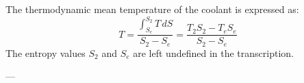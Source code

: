 The thermodynamic mean temperature of the coolant is expressed as:  
\[
T = \frac{\int_{S_e}^{S_2} T \, dS}{S_2 - S_e} = \frac{T_2 S_2 - T_e S_e}{S_2 - S_e}
\]  
The entropy values \( S_2 \) and \( S_e \) are left undefined in the transcription.

---